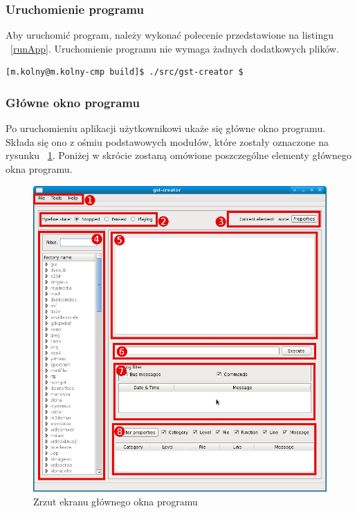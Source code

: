 \documentclass[12pt]{article}
\begin{document}
\subsubsection{Uruchomienie programu}
Aby uruchomić program, należy wykonać polecenie przedstawione na listingu ~\ref{runApp}. Uruchomienie programu nie wymaga żadnych dodatkowych plików.
\begin{lstlisting}[caption=Uruchomienie programu, label=runApp]
[m.kolny@m.kolny-cmp build]$ ./src/gst-creator $
\end{lstlisting} 
\subsubsection{Główne okno programu}
Po uruchomieniu aplikacji użytkownikowi ukaże się główne okno programu. Składa się ono z ośmiu podstawowych modułów, które zostały oznaczone na rysunku ~\ref{fig:mainWindow}. Poniżej w skrócie zostaną omówione poszczególne elementy głównego okna programu.
\begin{figure}[H]
  \includegraphics[width=160mm]{img/main-window.png}
  \caption{Zrzut ekranu głównego okna programu}
  \label{fig:mainWindow}
\end{figure}
\end{document}
